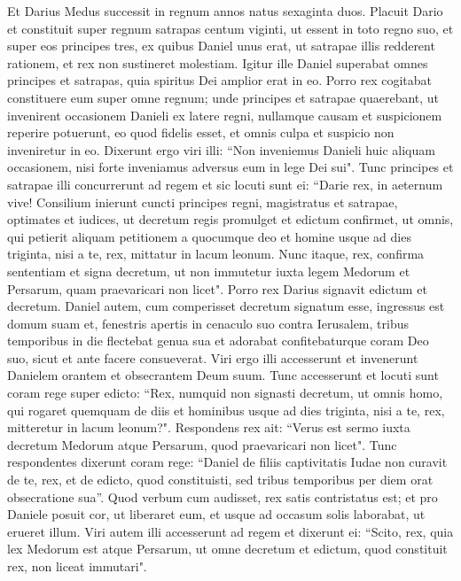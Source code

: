 \begin{biblechapter}  
\verse Et Darius Medus successit in regnum annos natus sexaginta duos. 
\verse Placuit Dario et constituit super regnum satrapas centum viginti, ut essent in toto regno suo, 
\verse et super eos principes tres, ex quibus Daniel unus erat, ut satrapae illis redderent rationem, et rex non sustineret molestiam. 
\verse Igitur ille Daniel superabat omnes principes et satrapas, quia spiritus Dei amplior erat in eo. Porro rex cogitabat constituere eum super omne regnum; 
\verse unde principes et satrapae quaerebant, ut invenirent occasionem Danieli ex latere regni, nullamque causam et suspicionem reperire potuerunt, eo quod fidelis esset, et omnis culpa et suspicio non inveniretur in eo. 
\verse Dixerunt ergo viri illi: “Non inveniemus Danieli huic aliquam occasionem, nisi forte inveniamus adversus eum in lege Dei sui". 
\verse Tunc principes et satrapae illi concurrerunt ad regem et sic locuti sunt ei: “Darie rex, in aeternum vive!  
\verse Consilium inierunt cuncti principes regni, magistratus et satrapae, optimates et iudices, ut decretum regis promulget et edictum confirmet, ut omnis, qui petierit aliquam petitionem a quocumque deo et homine usque ad dies triginta, nisi a te, rex, mittatur in lacum leonum. 
\verse Nunc itaque, rex, confirma sententiam et signa decretum, ut non immutetur iuxta legem Medorum et Persarum, quam praevaricari non licet". 
\verse Porro rex Darius signavit edictum et decretum. 
\verse Daniel autem, cum comperisset decretum signatum esse, ingressus est domum suam et, fenestris apertis in cenaculo suo contra Ierusalem, tribus temporibus in die flectebat genua sua et adorabat confitebaturque coram Deo suo, sicut et ante facere consueverat. 
\verse Viri ergo illi accesserunt et invenerunt Danielem orantem et obsecrantem Deum suum. 
\verse Tunc accesserunt et locuti sunt coram rege super edicto: “Rex, numquid non signasti decretum, ut omnis homo, qui rogaret quemquam de diis et hominibus usque ad dies triginta, nisi a te, rex, mitteretur in lacum leonum?". Respondens rex ait: “Verus est sermo iuxta decretum Medorum atque Persarum, quod praevaricari non licet". 
\verse Tunc respondentes dixerunt coram rege: “Daniel de filiis captivitatis Iudae non curavit de te, rex, et de edicto, quod constituisti, sed tribus temporibus per diem orat obsecratione sua”. 
\verse Quod verbum cum audisset, rex satis contristatus est; et pro Daniele posuit cor, ut liberaret eum, et usque ad occasum solis laborabat, ut erueret illum. 
\verse Viri autem illi accesserunt ad regem et dixerunt ei: “Scito, rex, quia lex Medorum est atque Persarum, ut omne decretum et edictum, quod constituit rex, non liceat immutari". 

\end{biblechapter}
